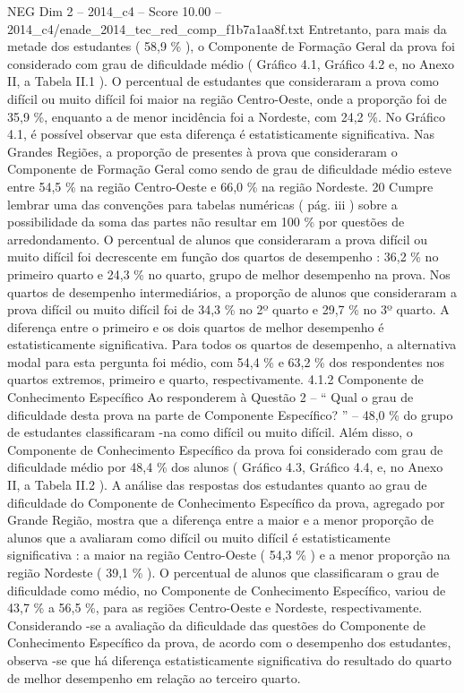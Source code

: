 \begin{textsample}{NEG Dim 2 – 2014\_c4 – Score 10.00 – 2014\_c4/enade\_2014\_tec\_red\_comp\_f1b7a1aa8f.txt}
Entretanto, para mais da metade dos estudantes ( 58,9 \% ), o Componente de Formação Geral da prova foi considerado com grau de dificuldade médio ( Gráfico 4.1, Gráfico 4.2 e, no Anexo II, a Tabela II.1 ).
O percentual de estudantes que consideraram a prova como difícil ou muito difícil foi maior na região Centro-Oeste, onde a proporção foi de 35,9 \%, enquanto a de menor incidência foi a Nordeste, com 24,2 \%.
No Gráfico 4.1, é possível observar que esta diferença é estatisticamente significativa.
Nas Grandes Regiões, a proporção de presentes à prova que consideraram o Componente de Formação Geral como sendo de grau de dificuldade médio esteve entre 54,5 \% na região Centro-Oeste e 66,0 \% na região Nordeste. 20 Cumpre lembrar uma das convenções para tabelas numéricas ( pág. iii ) sobre a possibilidade da soma das partes não resultar em 100 \% por questões de arredondamento.
O percentual de alunos que consideraram a prova difícil ou muito difícil foi decrescente em função dos quartos de desempenho : 36,2 \% no primeiro quarto e 24,3 \% no quarto, grupo de melhor desempenho na prova.
Nos quartos de desempenho intermediários, a proporção de alunos que consideraram a prova difícil ou muito difícil foi de 34,3 \% no 2º quarto e 29,7 \% no 3º quarto.
A diferença entre o primeiro e os dois quartos de melhor desempenho é estatisticamente significativa.
Para todos os quartos de desempenho, a alternativa modal para esta pergunta foi médio, com 54,4 \% e 63,2 \% dos respondentes nos quartos extremos, primeiro e quarto, respectivamente. 4.1.2 Componente de Conhecimento Específico Ao responderem à Questão 2 – “ Qual o grau de dificuldade desta prova na parte de Componente Específico? ” – 48,0 \% do grupo de estudantes classificaram -na como difícil ou muito difícil.
Além disso, o Componente de Conhecimento Específico da prova foi considerado com grau de dificuldade médio por 48,4 \% dos alunos ( Gráfico 4.3, Gráfico 4.4, e, no Anexo II, a Tabela II.2 ).
A análise das respostas dos estudantes quanto ao grau de dificuldade do Componente de Conhecimento Específico da prova, agregado por Grande Região, mostra que a diferença entre a maior e a menor proporção de alunos que a avaliaram como difícil ou muito difícil é estatisticamente significativa : a maior na região Centro-Oeste ( 54,3 \% ) e a menor proporção na região Nordeste ( 39,1 \% ).
O percentual de alunos que classificaram o grau de dificuldade como médio, no Componente de Conhecimento Específico, variou de 43,7 \% a 56,5 \%, para as regiões Centro-Oeste e Nordeste, respectivamente.
Considerando -se a avaliação da dificuldade das questões do Componente de Conhecimento Específico da prova, de acordo com o desempenho dos estudantes, observa -se que há diferença estatisticamente significativa do resultado do quarto de melhor desempenho em relação ao terceiro quarto.

\end{textsample}
